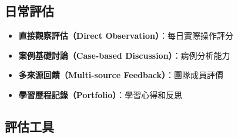 \documentclass[12pt,a4paper]{article}
\begin{document}
\subsection{日常評估}
\begin{itemize}[nosep]
    \item \textbf{直接觀察評估（Direct Observation）}：每日實際操作評分
    \item \textbf{案例基礎討論（Case-based Discussion）}：病例分析能力
    \item \textbf{多來源回饋（Multi-source Feedback）}：團隊成員評價
    \item \textbf{學習歷程記錄（Portfolio）}：學習心得和反思
\end{itemize}

\subsection{評估工具}
\end{document}
